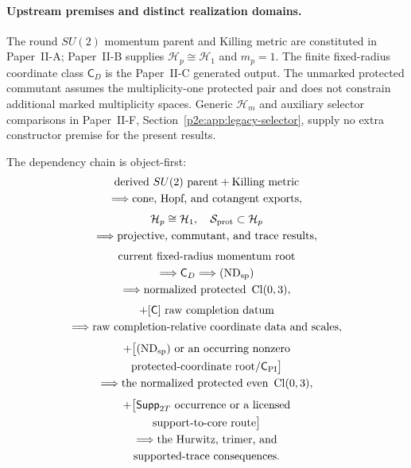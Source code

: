 \documentclass[12pt,a4paper]{article}
\begin{document}
\paragraph{Upstream premises and distinct realization domains.}
The round $SU(2)$ momentum parent and Killing metric are constituted in
Paper~II-A; Paper~II-B supplies $\mathcal H_p\cong\mathcal H_1$ and
$m_p=1$.  The finite fixed-radius coordinate class $\mathsf C_D$ is the
Paper~II-C generated output.  The unmarked protected commutant assumes
the multiplicity-one protected pair and does not constrain additional
marked multiplicity spaces.  Generic $\mathcal H_m$ and auxiliary
selector comparisons in Paper~II-F,
Section~\ref{p2e:app:legacy-selector}, supply no extra constructor
premise for the present results.

\begin{remark}
\label{p2:rem:kin-f-dependency-record}
The dependency chain is object-first:
\[
\begin{gathered}
 \text{derived }SU(2)\text{ parent}+\text{Killing metric}\\
 \Longrightarrow \text{cone, Hopf, and cotangent exports},\\[0.35em]
 \mathcal H_p\cong\mathcal H_1,\quad
 \mathcal S_{\rm prot}\subset\mathcal H_p\\
 \Longrightarrow \text{projective, commutant, and trace results},\\[0.35em]
 \text{current fixed-radius momentum root}\\
 \Longrightarrow \mathsf C_D \Longrightarrow (\mathrm{ND}_{\rm sp})\\
 \Longrightarrow \text{normalized protected }\Cl(0,3),\\[0.35em]
 +[\mathsf C]\text{ raw completion datum}\\
 \Longrightarrow \text{raw completion-relative coordinate data and scales},\\[0.35em]
 +\bigl[(\mathrm{ND}_{\rm sp})\ \text{or an occurring nonzero}\\
 \text{protected-coordinate root/}\mathsf C_{\rm PI}\bigr]\\
 \Longrightarrow \text{the normalized protected even }\Cl(0,3),\\[0.35em]
 +\bigl[\mathsf{Supp}_{2T}\text{ occurrence or a licensed}\\
 \text{support-to-core route}\bigr]\\
 \Longrightarrow \text{the Hurwitz, trimer, and}\\
 \text{supported-trace consequences}.

\end{gathered}\]
\end{remark}
\end{document}

